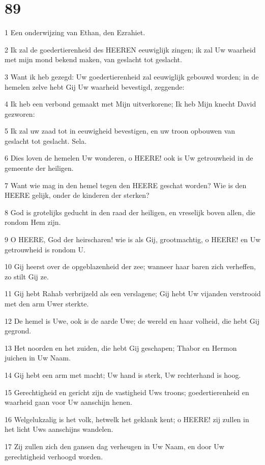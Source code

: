 \chapter{89}

\par 1 Een onderwijzing van Ethan, den Ezrahiet.
\par 2 Ik zal de goedertierenheid des HEEREN eeuwiglijk zingen; ik zal Uw waarheid met mijn mond bekend maken, van geslacht tot geslacht.
\par 3 Want ik heb gezegd: Uw goedertierenheid zal eeuwiglijk gebouwd worden; in de hemelen zelve hebt Gij Uw waarheid bevestigd, zeggende:
\par 4 Ik heb een verbond gemaakt met Mijn uitverkorene; Ik heb Mijn knecht David gezworen:
\par 5 Ik zal uw zaad tot in eeuwigheid bevestigen, en uw troon opbouwen van geslacht tot geslacht. Sela.
\par 6 Dies loven de hemelen Uw wonderen, o HEERE! ook is Uw getrouwheid in de gemeente der heiligen.
\par 7 Want wie mag in den hemel tegen den HEERE geschat worden? Wie is den HEERE gelijk, onder de kinderen der sterken?
\par 8 God is grotelijks geducht in den raad der heiligen, en vreselijk boven allen, die rondom Hem zijn.
\par 9 O HEERE, God der heirscharen! wie is als Gij, grootmachtig, o HEERE! en Uw getrouwheid is rondom U.
\par 10 Gij heerst over de opgeblazenheid der zee; wanneer haar baren zich verheffen, zo stilt Gij ze.
\par 11 Gij hebt Rahab verbrijzeld als een verslagene; Gij hebt Uw vijanden verstrooid met den arm Uwer sterkte.
\par 12 De hemel is Uwe, ook is de aarde Uwe; de wereld en haar volheid, die hebt Gij gegrond.
\par 13 Het noorden en het zuiden, die hebt Gij geschapen; Thabor en Hermon juichen in Uw Naam.
\par 14 Gij hebt een arm met macht; Uw hand is sterk, Uw rechterhand is hoog.
\par 15 Gerechtigheid en gericht zijn de vastigheid Uws troons; goedertierenheid en waarheid gaan voor Uw aanschijn henen.
\par 16 Welgelukzalig is het volk, hetwelk het geklank kent; o HEERE! zij zullen in het licht Uws aanschijns wandelen.
\par 17 Zij zullen zich den gansen dag verheugen in Uw Naam, en door Uw gerechtigheid verhoogd worden.

